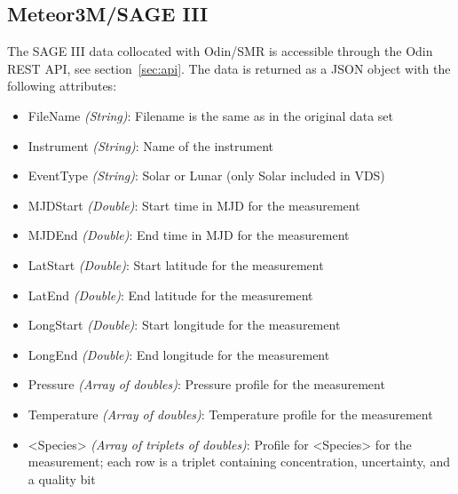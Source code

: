 \subsection{Meteor3M/SAGE III}
The SAGE III data collocated with Odin/SMR is accessible through the Odin REST
API, see section~\ref{sec:api}. The data is returned as a JSON object with the
following attributes:
\begin{itemize}
    \item FileName    \emph{(String)}: Filename is the same as in the original
        data set
    \item Instrument  \emph{(String)}: Name of the instrument
    \item EventType   \emph{(String)}: Solar or Lunar (only Solar included in
        VDS)
    \item MJDStart    \emph{(Double)}: Start time in MJD for the measurement
    \item MJDEnd      \emph{(Double)}: End time in MJD for the measurement
    \item LatStart    \emph{(Double)}: Start latitude for the measurement
    \item LatEnd      \emph{(Double)}: End latitude for the measurement
    \item LongStart   \emph{(Double)}: Start longitude for the measurement
    \item LongEnd     \emph{(Double)}: End longitude for the measurement
    \item Pressure    \emph{(Array of doubles)}: Pressure profile for the
        measurement
    \item Temperature \emph{(Array of doubles)}: Temperature profile for the
        measurement
    \item <Species>   \emph{(Array of triplets of doubles)}: Profile for
        <Species> for the measurement; each row is a triplet containing
        concentration, uncertainty, and a quality bit
\end{itemize}
